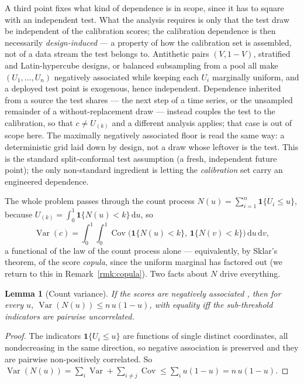 \documentclass[11pt]{article}
\newtheorem{lemma}{Lemma}
\begin{document}
A third point fixes what kind of dependence is in scope, since it has to square with an independent
test. What the analysis requires is only that the test draw be independent of the calibration scores;
the calibration dependence is then necessarily \emph{design-induced} --- a property of how the
calibration set is assembled, not of a data stream the test belongs to. Antithetic pairs
$(V,1-V)$, stratified and Latin-hypercube designs, or balanced subsampling from a pool all make
$(U_1,\dots,U_n)$ negatively associated while keeping each $U_i$ marginally uniform, and a deployed test
point is exogenous, hence independent. Dependence inherited from a source the test shares --- the next
step of a time series, or the unsampled remainder of a without-replacement draw --- instead couples the
test to the calibration, so that $c\ne U_{(k)}$ and a different analysis applies; that case is out of
scope here. The maximally negatively associated floor is read the same way: a deterministic grid laid
down by design, not a draw whose leftover is the test. This is the standard split-conformal test
assumption (a fresh, independent future point); the only non-standard ingredient is letting the
\emph{calibration} set carry an engineered dependence.

The whole problem passes through the count process $N(u)=\sum_{i=1}^n\mathbf 1\{U_i\le u\}$, because
$U_{(k)}=\int_0^1\mathbf 1\{N(u)<k\}\,\mathrm du$, so
\begin{equation}
\operatorname{Var}(c)=\int_0^1\!\!\int_0^1\operatorname{Cov}\big(\mathbf 1\{N(u)<k\},\,
\mathbf 1\{N(v)<k\}\big)\,\mathrm du\,\mathrm dv,
\end{equation}
a functional of the law of the count process alone --- equivalently, by Sklar's theorem, of the score
\emph{copula}, since the uniform marginal has factored out (we return to this in
Remark~\ref{rmk:copula}). Two facts about $N$ drive everything.

\begin{lemma}[Count variance]\label{lem:count}
If the scores are negatively associated \citep{joagdev1983}, then for every $u$,
$\operatorname{Var}(N(u))\le n\,u(1-u)$, with equality iff the sub-threshold indicators are pairwise
uncorrelated.
\end{lemma}
\begin{proof}
The indicators $\mathbf 1\{U_i\le u\}$ are functions of single distinct coordinates, all nondecreasing
in the same direction, so negative association is preserved and they are pairwise non-positively
correlated. So
$\operatorname{Var}(N(u))=\sum_i\operatorname{Var}+\sum_{i\ne j}\operatorname{Cov}\le
\sum_i u(1-u)=n\,u(1-u)$.
\end{proof}
\end{document}
